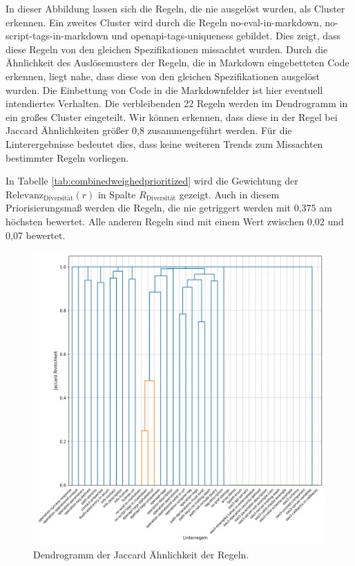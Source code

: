 In dieser Abbildung lassen sich die Regeln, die nie ausgelöst wurden, als Cluster erkennen. Ein zweites Cluster wird durch die Regeln no-eval-in-markdown, no-script-tags-in-markdown und openapi-tags-uniqueness gebildet. Dies zeigt, dass diese Regeln von den gleichen Spezifikationen missachtet wurden. Durch die Ähnlichkeit des Auslösemusters der Regeln, die in Markdown eingebetteten Code erkennen, liegt nahe, dass diese von den gleichen Spezifikationen ausgelöst wurden. Die Einbettung von Code in die Markdownfelder ist hier eventuell intendiertes Verhalten. Die verbleibenden 22 Regeln werden im Dendrogramm in ein großes Cluster eingeteilt. Wir können erkennen, dass diese in der Regel bei Jaccard Ähnlichkeiten größer 0,8 zusammengeführt werden. Für die Linterergebnisse bedeutet dies, dass keine weiteren Trends zum Missachten bestimmter Regeln vorliegen. 

In Tabelle \ref{tab:combinedweighedprioritized} wird die Gewichtung der $\text{Relevanz}_\text{Diversität}(r)$ in Spalte $R_\text{Diversität}$ gezeigt. Auch in diesem Priorisierungsmaß werden die Regeln, die nie getriggert werden mit 0,375 am höchsten bewertet. Alle anderen Regeln sind mit einem Wert zwischen 0,02 und 0,07 bewertet.

\begin{figure}[htbp]
  \centering
  \includegraphics[width=1\linewidth]{img/hierarchicalclusteronbinary.png}
  \caption{Dendrogramm der Jaccard Ähnlichkeit der Regeln.}
  \label{fig:hierarchicalclusteronbinary}
\end{figure}


